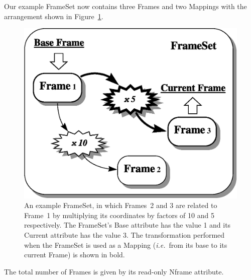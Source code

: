 \documentclass[twoside,11pt]{article}
\newenvironment{latexonly}{}{}
\newcommand{\htmlref}[2]{#1}
\begin{document}
\begin{latexonly}
   Our example FrameSet now contains three Frames and two Mappings with
   the arrangement shown in Figure~\ref{fig:fsexample}.
   \begin{figure}
   \begin{center}
   \includegraphics[scale=0.6]{sun211_figures/fsexample.eps}
   \caption{An example FrameSet, in which Frames~2 and 3 are related to
   Frame~1 by multiplying its coordinates by factors of 10 and 5
   respectively. The FrameSet's \htmlref{Base}{Base} attribute has the value 1 and its
   \htmlref{Current}{Current} attribute has the value 3. The transformation performed when
   the FrameSet is used as a Mapping ({\em{i.e.}}\ from its base to
   its current Frame) is shown in bold.}
   \label{fig:fsexample}
   \end{center}
   \end{figure}
   The total number of Frames is given by its read-only \htmlref{Nframe}{Nframe} attribute.
\end{latexonly}
\end{document}
